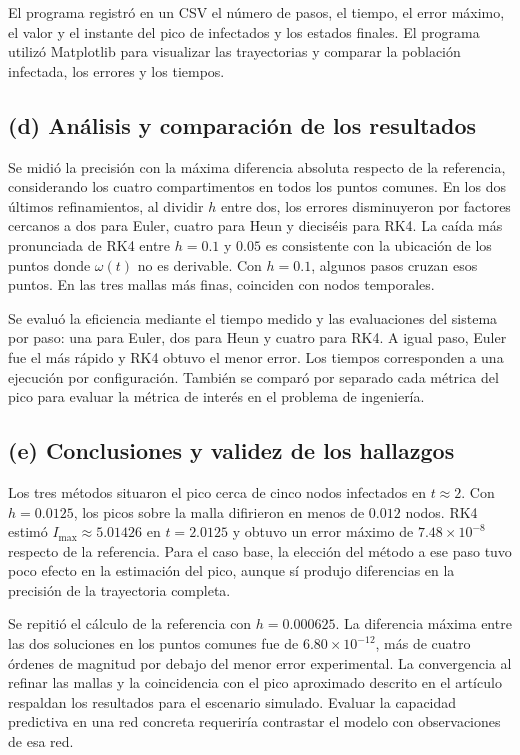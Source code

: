 \documentclass[11pt,a4paper]{article}
\begin{document}
El programa registró en un CSV el número de pasos, el tiempo, el error máximo, el valor y el instante del pico de infectados y los estados finales. El programa utilizó Matplotlib para visualizar las trayectorias y comparar la población infectada, los errores y los tiempos.

\clearpage
\subsection*{(d) Análisis y comparación de los resultados}

Se midió la precisión con la máxima diferencia absoluta respecto de la referencia, considerando los cuatro compartimentos en todos los puntos comunes. En los dos últimos refinamientos, al dividir $h$ entre dos, los errores disminuyeron por factores cercanos a dos para Euler, cuatro para Heun y dieciséis para RK4. La caída más pronunciada de RK4 entre $h=0.1$ y $0.05$ es consistente con la ubicación de los puntos donde $\omega(t)$ no es derivable. Con $h=0.1$, algunos pasos cruzan esos puntos. En las tres mallas más finas, coinciden con nodos temporales.

Se evaluó la eficiencia mediante el tiempo medido y las evaluaciones del sistema por paso: una para Euler, dos para Heun y cuatro para RK4. A igual paso, Euler fue el más rápido y RK4 obtuvo el menor error. Los tiempos corresponden a una ejecución por configuración. También se comparó por separado cada métrica del pico para evaluar la métrica de interés en el problema de ingeniería.

\subsection*{(e) Conclusiones y validez de los hallazgos}

Los tres métodos situaron el pico cerca de cinco nodos infectados en $t\approx2$. Con $h=0.0125$, los picos sobre la malla difirieron en menos de $0.012$ nodos. RK4 estimó $I_{\max}\approx5.01426$ en $t=2.0125$ y obtuvo un error máximo de $7.48\times10^{-8}$ respecto de la referencia. Para el caso base, la elección del método a ese paso tuvo poco efecto en la estimación del pico, aunque sí produjo diferencias en la precisión de la trayectoria completa.

Se repitió el cálculo de la referencia con $h=0.000625$. La diferencia máxima entre las dos soluciones en los puntos comunes fue de $6.80\times10^{-12}$, más de cuatro órdenes de magnitud por debajo del menor error experimental. La convergencia al refinar las mallas y la coincidencia con el pico aproximado descrito en el artículo \cite{martinez2021} respaldan los resultados para el escenario simulado. Evaluar la capacidad predictiva en una red concreta requeriría contrastar el modelo con observaciones de esa red.
\end{document}
